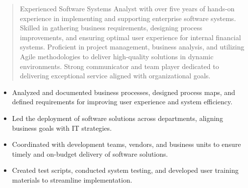 



\makecvheader

\begin{quote}
  \noindent
  Experienced Software Systems Analyst with over five years of hands-on experience in implementing and supporting enterprise software systems. Skilled in gathering business requirements, designing process improvements, and ensuring optimal user experience for internal financial systems. Proficient in project management, business analysis, and utilizing Agile methodologies to deliver high-quality solutions in dynamic environments. Strong communicator and team player dedicated to delivering exceptional service aligned with organizational goals.
\end{quote}

\par\smallskip
\noindent
\begin{minipage}{20cm}
  \begin{minipage}{9.75cm}
    \begin{itemize}
      \item Analyzed and documented business processes, designed process maps, and defined requirements for improving user experience and system efficiency.
      \item Led the deployment of software solutions across departments, aligning business goals with IT strategies.
    \end{itemize}
  \end{minipage}
  \hfill
  \begin{minipage}{9.75cm}
    \begin{itemize}
      \item Coordinated with development teams, vendors, and business units to ensure timely and on-budget delivery of software solutions.
      \item Created test scripts, conducted system testing, and developed user training materials to streamline implementation.
    \end{itemize}
  \end{minipage}
\end{minipage}
\par\smallskip
\divider

